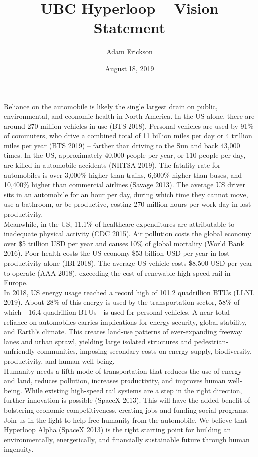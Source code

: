 \documentclass{article}
\title{UBC Hyperloop -- Vision Statement}
\author[1,*]{Adam Erickson}
\affil[1]{UBC Unmanned Aircraft Systems, Vancouver, BC, V6T 1Z4, Canada}
\affil[*]{E-mail: \texttt{REDACTED}}
\date{August 18, 2019}
\begin{document}
\maketitle

Reliance on the automobile is likely the single largest drain on public, environmental, and economic health in North America. In the US alone, there are around 270 million vehicles in use (BTS 2018). Personal vehicles are used by 91\% of commuters, who drive a combined total of 11 billion miles per day or 4 trillion miles per year (BTS 2019) -- farther than driving to the Sun and back 43,000 times. In the US, approximately 40,000 people per year, or 110 people per day, are killed in automobile accidents (NHTSA 2019). The fatality rate for automobiles is over 3,000\% higher than trains, 6,600\% higher than buses, and 10,400\% higher than commercial airlines (Savage 2013). The average US driver sits in an automobile for an hour per day, during which time they cannot move, use a bathroom, or be productive, costing 270 million hours per work day in lost productivity.\\

Meanwhile, in the US, 11.1\% of healthcare expenditures are attributable to inadequate physical activity (CDC 2015). Air pollution costs the global economy over \$5 trillion USD per year and causes 10\% of global mortality (World Bank 2016). Poor health costs the US economy \$53 billion USD per year in lost productivity alone (IBI 2018). The average US vehicle costs \$8,500 USD per year to operate (AAA 2018), exceeding the cost of renewable high-speed rail in Europe.\\

In 2018, US energy usage reached a record high of 101.2 quadrillion BTUs (LLNL 2019). About 28\% of this energy is used by the transportation sector, 58\% of which - 16.4 quadrillion BTUs - is used for personal vehicles. A near-total reliance on automobiles carries implications for energy security, global stability, and Earth's climate. This creates land-use patterns of ever-expanding freeway lanes and urban sprawl, yielding large isolated structures and pedestrian-unfriendly communities, imposing secondary costs on energy supply, biodiversity, productivity, and human well-being.\\

Humanity needs a fifth mode of transportation that reduces the use of energy and land, reduces pollution, increases productivity, and improves human well-being. While existing high-speed rail systems are a step in the right direction, further innovation is possible (SpaceX 2013). This will have the added benefit of bolstering economic competitiveness, creating jobs and funding social programs. Join us in the fight to help free humanity from the automobile. We believe that Hyperloop Alpha (SpaceX 2013) is the right starting point for building an environmentally, energetically, and financially sustainable future through human ingenuity.
\end{document}

